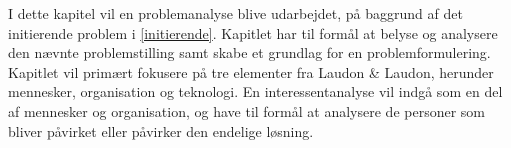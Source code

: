 I dette kapitel vil en problemanalyse blive udarbejdet, på baggrund af det initierende problem i \cref{initierende}. Kapitlet har til formål at belyse og analysere den nævnte problemstilling samt skabe et grundlag for en problemformulering. Kapitlet vil primært fokusere på tre elementer fra Laudon \& Laudon, herunder mennesker, organisation og teknologi. En interessentanalyse vil indgå som en del af mennesker og organisation, og have til formål at analysere de personer som bliver påvirket eller påvirker den endelige løsning. 
